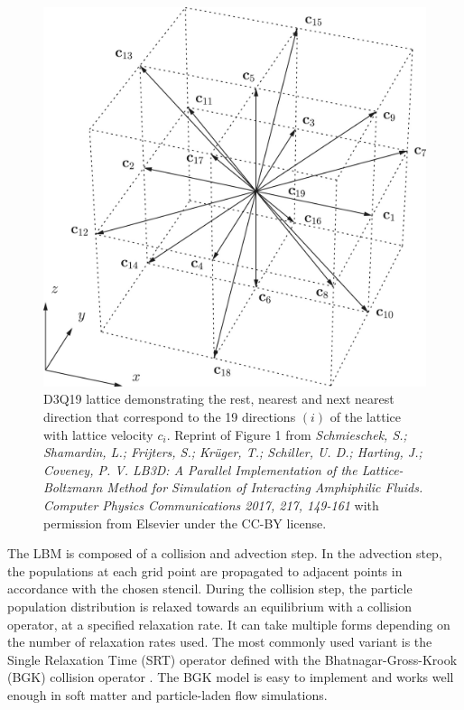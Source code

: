 \begin{figure}[h]
    \centering
    \includegraphics[scale = 1]{figures/methods/d3q19_lattice.jpg}
    \caption{D3Q19 lattice demonstrating the rest, nearest and next nearest direction that correspond to the 19 
    directions $(i)$ of the lattice with lattice velocity $c_{i}$. Reprint of Figure 1 from
    \textit{Schmieschek, S.; Shamardin, L.; Frijters, S.; Krüger, T.; Schiller, U. D.; Harting, J.; Coveney, P. V. LB3D: A Parallel Implementation of the Lattice-Boltzmann Method for Simulation of Interacting Amphiphilic Fluids. Computer Physics Communications 2017, 217, 149-161} 
    with permission from Elsevier under the CC-BY license.}
    \label{fig:d3q19_lattice}
\end{figure}

The LBM is composed of a collision and advection step. In the advection step, the populations at each grid point are propagated to adjacent points in accordance 
with the chosen stencil. During the collision step, the particle population distribution is relaxed towards an equilibrium with a collision operator, at a 
specified relaxation rate. It can take multiple forms depending on the number of
relaxation rates used. The most commonly used variant is the Single Relaxation Time (SRT) operator defined with the Bhatnagar-Gross-Krook (BGK) 
collision operator \cite{bhatnagar_model_1954, qian_lattice_1992}. The BGK model is easy to implement and works well enough in soft matter and
particle-laden flow simulations.

